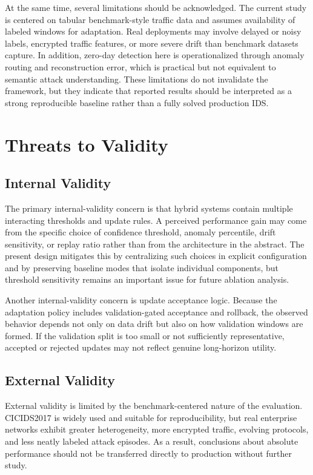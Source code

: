 \documentclass[conference]{IEEEtran}
\begin{document}
At the same time, several limitations should be acknowledged. The current study is centered on tabular benchmark-style traffic data and assumes availability of labeled windows for adaptation. Real deployments may involve delayed or noisy labels, encrypted traffic features, or more severe drift than benchmark datasets capture. In addition, zero-day detection here is operationalized through anomaly routing and reconstruction error, which is practical but not equivalent to semantic attack understanding. These limitations do not invalidate the framework, but they indicate that reported results should be interpreted as a strong reproducible baseline rather than a fully solved production IDS.

\section{Threats to Validity}
\subsection{Internal Validity}
The primary internal-validity concern is that hybrid systems contain multiple interacting thresholds and update rules. A perceived performance gain may come from the specific choice of confidence threshold, anomaly percentile, drift sensitivity, or replay ratio rather than from the architecture in the abstract. The present design mitigates this by centralizing such choices in explicit configuration and by preserving baseline modes that isolate individual components, but threshold sensitivity remains an important issue for future ablation analysis.

Another internal-validity concern is update acceptance logic. Because the adaptation policy includes validation-gated acceptance and rollback, the observed behavior depends not only on data drift but also on how validation windows are formed. If the validation split is too small or not sufficiently representative, accepted or rejected updates may not reflect genuine long-horizon utility.

\subsection{External Validity}
External validity is limited by the benchmark-centered nature of the evaluation. CICIDS2017 is widely used and suitable for reproducibility, but real enterprise networks exhibit greater heterogeneity, more encrypted traffic, evolving protocols, and less neatly labeled attack episodes. As a result, conclusions about absolute performance should not be transferred directly to production without further study.
\end{document}
